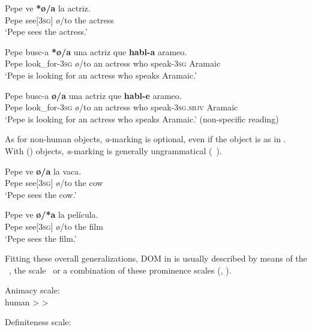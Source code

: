 \documentclass[output=paper]{LSP/langsci}
\begin{document}
\begin{exe}
\ex%
\ea \label{08-ga-ex:1a}
\gll Pepe ve \textbf{*ø/a} la actriz.\\
 Pepe see[\textsc{3sg}] ø/to the actress\\
\glt ‘Pepe sees the actress.’

\ex \label{08-ga-ex:1b}
\gll Pepe busc-a \textbf{*ø/a} una actriz que \textbf{habl-a} arameo.\\
 Pepe look\_for-3\textsc{sg} ø/to an actress who speak-3\textsc{sg} Aramaic\\
\glt ‘Pepe is looking for an actress who speaks Aramaic.’

\ex \label{08-ga-ex:1c}
\gll Pepe busc-a \textbf{ø/a} una actriz que \textbf{habl-e} arameo.\\
 Pepe look\_for-3\textsc{sg} ø/to an actress who speak-3\textsc{sg.sbjv} Aramaic\\
\glt ‘Pepe is looking for an actress who speaks Aramaic.’ (non-specific reading)\\
\z
\end{exe}

As for  non-human objects, \textit{a}-marking is optional, even if the object is  as in . With  () objects, \textit{a}-marking is generally ungrammatical (\cf~).

\ea \label{08-ga-ex:2}
\gll Pepe ve \textbf{ø/a} la vaca.\\
Pepe see[\textsc{3sg]} ø/to the cow\\
\glt ‘Pepe sees the cow.’
\z

\ea \label{08-ga-ex:3}
\gll Pepe ve \textbf{ø/*a} la película.\\
Pepe see[\textsc{3sg]} ø/to the film\\
\glt ‘Pepe sees the film.’
\z

Fitting these overall generalizations, DOM in  is usually described by means of the ~, the  scale~ or a combination of these prominence scales (\cf \citealt[417--418]{Aissen2003Differential}, \citealt[436]{Laca2006Objeto}).

\ea \label{08-ga-ex:4}
Animacy scale:\\

 human >  > 

\z

\ea \label{08-ga-ex:5}
Definiteness scale:
\end{document}

